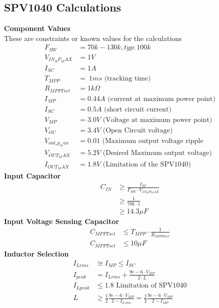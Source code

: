 \documentclass{article}
\numberwithin{figure}{section}
\numberwithin{equation}{section}
\begin{document}
{\subsection{SPV1040 Calculations}\label{app:spvcalcs}
\textbf{Component Values} \\
These are constraints or known values for the calculations
\begin{align*}
  F_{SW}&=70k-130k,typ:100k \\
  V_{IN_RP_MAX}&=1V \\
  I_{SC} &= 1A \\
  T_{MPP} &= ~1ms \mbox{ (tracking time)} \\
  R_{MPPTset} &= 1k\Omega \\
  I_{MP} &= 0.44A\mbox{ (current at maximum power point)} \\
  I_{SC} &= 0.5A\mbox{ (short circuit current)} \\
  V_{MP} &= 3.0V\mbox{ (Voltage at maximum power point) }\\
  V_{OC} &= 3.4V\mbox{ (Open Circuit voltage)} \\
  V_{out_rp_max} &=  0.01 \mbox{ (Maximum output voltage ripple} \\
  V_{OUT_MAX} &= 5.2V \mbox{ (Desired Maximum output voltage)} \\
  I_{OUT_MAX} &= 1.8V \mbox{ (Limitation of the SPV1040)}
\end{align*}
\textbf{Input Capacitor}
\begin{align}
  \label{eq:incap}
  C_{IN}&\geq \frac{I_{SC}}{F_{SW}\cdot V_{IN_RP_MAX}} \\
  &\geq \frac{1}{70k\cdot 1} \\
  &\geq 14.3\mu F
\end{align}
\textbf{Input Voltage Sensing Capacitor}
\begin{align}
  \label{eq:vincap}
  C_{MPPTset}&\leq T_{MPP} \cdot \frac{1}{R_{MPPTset}} \\
  C_{MPPTset}&\leq 10\mu F
\end{align}
\textbf{Inductor Selection}
\begin{align}
  \label{eq:spvind}
  I_{Lrms} &\cong I_{MP}\leq I_{SC} \\
  I_{peak} &= I_{Lrms} + \frac{9e-6 \cdot V_{MP}}{2\cdot L} \\
  I_{Lpeak} &\leq 1.8 \mbox{ Limitation of SPV1040} \\
  L &\geq \frac{1}{2} \frac{9e-6\cdot V_{MP}}{2-I_{Lrms}} = \frac{1}{2}\frac{9e-6\cdot V_{MP}}{2-I_{MP}}\\

\end{align}}
\end{document}

